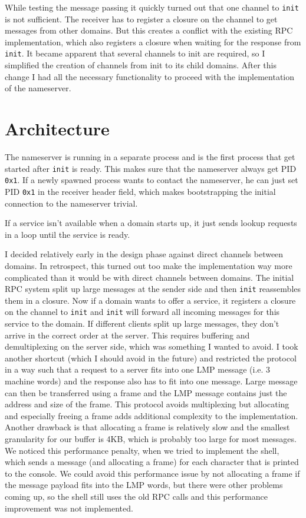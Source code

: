 While testing the message passing it quickly turned out that one channel to \verb|init| is not sufficient. The receiver
has to register a closure on the channel to get messages from other domains. But this creates a conflict with the 
existing RPC implementation, which also registers a closure when waiting for the response from \verb|init|. It became
apparent that several channels to init are required, so I simplified the creation of channels from init to its child
domains. After this change I had all the necessary functionality to proceed with the implementation of the nameserver.

\section
{
    Architecture
}
\label{ns-architecture}

The nameserver is running in a separate process and is the first process that get started after \verb|init| is ready. This makes
sure that the nameserver always get PID \texttt{0x1}. If a newly spawned process wants to contact the nameserver, he can just
set PID \texttt{0x1} in the receiver header field, which makes bootstrapping the initial connection to the nameserver trivial.

If a service isn't available when a domain starts up, it just sends lookup requests in a loop until the service is ready.

I decided relatively early in the design phase against direct channels between domains. In retrospect, this turned out too make
the implementation way more complicated than it would be with direct channels between domains. The initial RPC system split up large
messages at the sender side and then \verb|init| reassembles them in a closure. Now if a domain wants to offer a service, it registers
a closure on the channel to \verb|init| and \verb|init| will forward all incoming messages for this service to the domain. If different
clients split up large messages, they don't arrive in the correct order at the server. This requires buffering and demultiplexing
on the server side, which was something I wanted to avoid. I took another shortcut (which I should avoid in the future) and restricted
the protocol in a way such that a request to a server fits into one LMP message (i.e. 3 machine words) and the response also has to 
fit into one message. Large message can then be transferred using a frame and the LMP message contains just the address and size of
the frame. This protocol avoids multiplexing but allocating and especially freeing a frame adds additional complexity to the 
implementation. Another drawback is that allocating a frame is relatively slow and the smallest granularity for our buffer is 4KB,
which is probably too large for most messages. We noticed this performance penalty, when we tried to implement the shell, which
sends a message (and allocating a frame) for each character that is printed to the console. We could avoid this performance issue
by not allocating a frame if the message payload fits into the LMP words, but there were other problems coming up, so the shell
still uses the old RPC calls and this performance improvement was not implemented.

